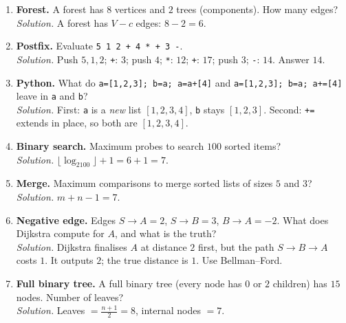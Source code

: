 \documentclass[11pt,a4paper]{article}
\newcommand{\py}[1]{\texttt{#1}}
\begin{document}
\begin{enumerate}[leftmargin=*,itemsep=6pt]
\item \textbf{Forest.} A forest has $8$ vertices and $2$ trees (components). How many edges?\\
\emph{Solution.} A forest has $V-c$ edges: $8-2=6$.

\item \textbf{Postfix.} Evaluate \py{5 1 2 + 4 * + 3 -}.\\
\emph{Solution.} Push $5,1,2$; \py{+}: $3$; push $4$; \py{*}: $12$; \py{+}: $17$; push $3$; \py{-}: $14$. Answer $14$.

\item \textbf{Python.} What do \py{a=[1,2,3]; b=a; a=a+[4]} and \py{a=[1,2,3]; b=a; a+=[4]} leave in \py{a} and \py{b}?\\
\emph{Solution.} First: \py{a} is a \emph{new} list $[1,2,3,4]$, \py{b} stays $[1,2,3]$. Second: \py{+=} extends in place, so both are $[1,2,3,4]$.

\item \textbf{Binary search.} Maximum probes to search $100$ sorted items?\\
\emph{Solution.} $\lfloor\log_2100\rfloor+1=6+1=7$.

\item \textbf{Merge.} Maximum comparisons to merge sorted lists of sizes $5$ and $3$?\\
\emph{Solution.} $m+n-1=7$.

\item \textbf{Negative edge.} Edges $S\to A=2$, $S\to B=3$, $B\to A=-2$. What does Dijkstra compute for $A$, and what is the truth?\\
\emph{Solution.} Dijkstra finalises $A$ at distance $2$ first, but the path $S\to B\to A$ costs $1$. It outputs $2$; the true distance is $1$. Use Bellman--Ford.

\item \textbf{Full binary tree.} A full binary tree (every node has $0$ or $2$ children) has $15$ nodes. Number of leaves?\\
\emph{Solution.} Leaves $=\frac{n+1}{2}=8$, internal nodes $=7$.
\end{enumerate}
\end{document}
